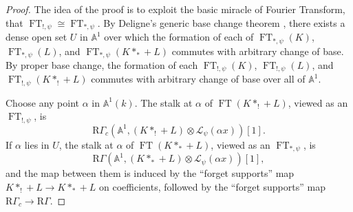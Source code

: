 \begin{proof}
The idea of the proof is to exploit the basic miracle of Fourier Transform,
that \(\operatorname{FT}_{!,\psi}\cong\operatorname{FT}_{*,\psi}\). By
Deligne's generic base change theorem \cite[Cor.~2.9]{De-ThFin}, there exists a
dense open set \(U\) in \(\mathbb{A}^1\) over which the formation of each of
\(\operatorname{FT}_{*,\psi}(K)\), \(\operatorname{FT}_{*,\psi}(L)\), and
\(\operatorname{FT}_{*,\psi}(K*_*+L)\) commutes with arbitrary change of base.
By proper base change, the formation of each
\(\operatorname{FT}_{!,\psi}(K)\), \(\operatorname{FT}_{!,\psi}(L)\), and
\(\operatorname{FT}_{!,\psi}(K*_!+L)\) commutes with arbitrary change of base
over all of \(\mathbb{A}^1\).

Choose any point \(\alpha\) in \(\mathbb{A}^1(k)\). The stalk at \(\alpha\) of
\(\operatorname{FT}(K*_!+L)\), viewed as an \(\operatorname{FT}_{!,\psi}\), is
\[
  \mathrm{R}\Gamma_c(\mathbb{A}^1,(K*_!+L)\otimes\mathcal{L}_\psi(\alpha x))[1].
\]
If \(\alpha\) lies in \(U\), the stalk at \(\alpha\) of
\(\operatorname{FT}(K*_*+L)\), viewed as an \(\operatorname{FT}_{*,\psi}\), is
\[
  \mathrm{R}\Gamma(\mathbb{A}^1,(K*_*+L)\otimes\mathcal{L}_\psi(\alpha x))[1],
\]
and the map between them is induced by the ``forget supports'' map
\(K*_!+L\to K*_*+L\) on coefficients, followed by the ``forget supports'' map
\(\mathrm{R}\Gamma_c\to\mathrm{R}\Gamma\).


\end{proof}
